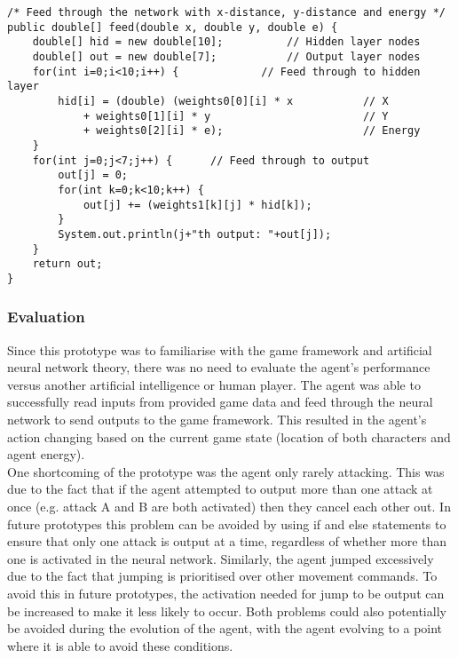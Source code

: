 \documentclass[12pt,a4paper]{article}
\begin{document}
\vspace{6mm}

\begin{lstlisting}[caption=Feed method in class ANN]
/* Feed through the network with x-distance, y-distance and energy */
public double[] feed(double x, double y, double e) {
	double[] hid = new double[10];			// Hidden layer nodes
	double[] out = new double[7];			// Output layer nodes
	for(int i=0;i<10;i++) {				// Feed through to hidden layer
		hid[i] = (double) (weights0[0][i] * x			// X
			+ weights0[1][i] * y						// Y
			+ weights0[2][i] * e);						// Energy
	}
	for(int j=0;j<7;j++) {		// Feed through to output
		out[j] = 0;
		for(int k=0;k<10;k++) {
			out[j] += (weights1[k][j] * hid[k]);
		}
		System.out.println(j+"th output: "+out[j]);
	}
	return out;
}
\end{lstlisting}

\newpage
\subsubsection{Evaluation}
Since this prototype was to familiarise with the game framework and artificial neural network theory, there was no need to evaluate the agent's performance versus another artificial intelligence or human player. The agent was able to successfully read inputs from provided game data and feed through the neural network to send outputs to the game framework. This resulted in the agent's action changing based on the current game state (location of both characters and agent energy).\\

One shortcoming of the prototype was the agent only rarely attacking. This was due to the fact that if the agent attempted to output more than one attack at once (e.g. attack A and B are both activated) then they cancel each other out. In future prototypes this problem can be avoided by using if and else statements to ensure that only one attack is output at a time, regardless of whether more than one is activated in the neural network. Similarly, the agent jumped excessively due to the fact that jumping is prioritised over other movement commands. To avoid this in future prototypes, the activation needed for jump to be output can be increased to make it less likely to occur. Both problems could also potentially be avoided during the evolution of the agent, with the agent evolving to a point where it is able to avoid these conditions.\\
\end{document}
